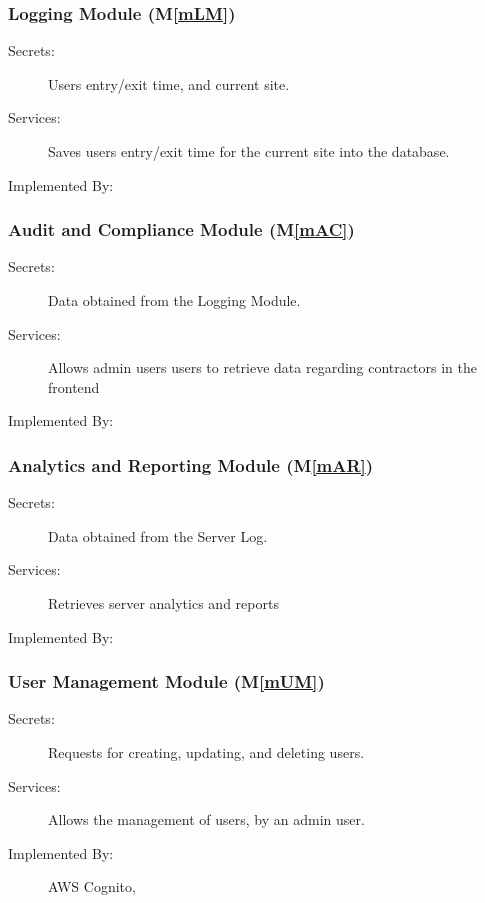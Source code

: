 \documentclass[12pt, titlepage]{article}
\newcommand{\mref}[1]{M\ref{#1}}
\begin{document}
\subsubsection{Logging Module (\mref{mLM})}
\begin{description}
  \item[Secrets:] Users entry/exit time, and current site.
  \item[Services:] Saves users entry/exit time for the current site
    into the database.
  \item[Implemented By:] \progname
\end{description}

\subsubsection{Audit and Compliance Module (\mref{mAC})}

\begin{description}
  \item[Secrets:] Data obtained from the Logging Module.
  \item[Services:] Allows admin users users to retrieve data regarding
    contractors in the frontend
  \item[Implemented By:] \progname
\end{description}

\subsubsection{Analytics and Reporting Module (\mref{mAR})}
\begin{description}
  \item[Secrets:] Data obtained from the Server Log.
  \item[Services:] Retrieves server analytics and reports
  \item[Implemented By:] \progname
\end{description}

\subsubsection{User Management Module (\mref{mUM})}
\begin{description}
  \item[Secrets:] Requests for creating, updating, and deleting users.
  \item[Services:] Allows the management of users, by an admin user.
  \item[Implemented By:] AWS Cognito, \progname
\end{description}
\end{document}
